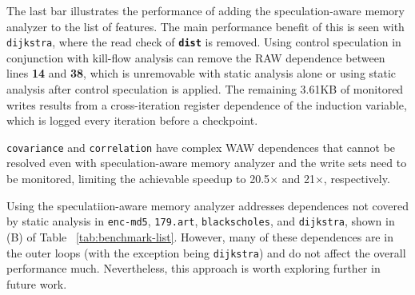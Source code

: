 The last bar illustrates the performance of adding the speculation-aware
memory analyzer to the list of features. The main performance benefit of
this is seen with \texttt{dijkstra}, where the read check of
\texttt{\textbf{dist}} is removed. Using control speculation in conjunction
with kill-flow analysis can remove the RAW dependence between lines
\textbf{14} and \textbf{38}, which is unremovable with static analysis
alone or using static analysis after control speculation is applied.
The remaining 3.61KB of monitored writes results from a cross-iteration
register dependence of the induction variable, which is logged every
iteration before a checkpoint.

\texttt{covariance} and \texttt{correlation} have complex WAW dependences
that cannot be resolved even with speculation-aware memory analyzer and
the write sets need to be monitored, limiting the achievable speedup to
20.5$\times$ and 21$\times$, respectively.



Using the speculatiion-aware memory analyzer addresses dependences not
covered by static analysis in
\texttt{enc-md5}, \texttt{179.art}, \texttt{blackscholes}, and
\texttt{dijkstra}, shown in (B) of Table ~\ref{tab:benchmark-list}. However,
many of these dependences are in the outer loops (with the exception
being \texttt{dijkstra}) and do not affect the overall performance much.
Nevertheless, this approach is worth exploring further in future work.




